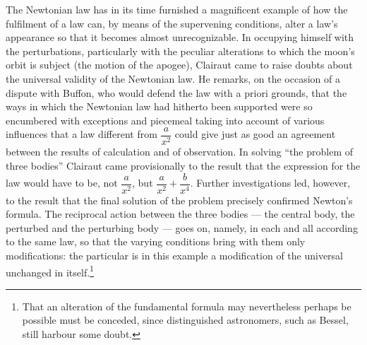 \documentclass[12pt,a4paper]{book}
\begin{document}
The Newtonian law has in its time furnished a magnificent example of how the fulfilment
of a law can, by means of the
supervening conditions, alter a law's appearance so that it becomes almost
unrecognizable. In occupying himself with the perturbations, particularly with the
peculiar alterations to which the moon's orbit is subject (the motion of the apogee),
Clairaut came to raise doubts about the universal validity of the Newtonian law. He
remarks, on the occasion of a dispute with Buffon, who would defend the law with a
priori grounds, that the ways in which the Newtonian law had hitherto been supported
were so encumbered with exceptions and piecemeal taking into account of various
influences that a law different from $\dfrac{a}{x^{2}}$ could give just as good an
agreement between the results of calculation and of observation. In solving ``the
problem of three bodies'' Clairaut came provisionally to the result that the expression
for the law would have to be, not $\dfrac{a}{x^{2}}$, but
$\dfrac{a}{x^{2}} + \dfrac{b}{x^{4}}$. Further investigations led, however, to the
result that the final solution of the problem precisely confirmed Newton's formula. The
reciprocal action between the three bodies --- the central body, the perturbed and the
perturbing body --- goes on, namely, in each and all according to the same law, so that
the varying conditions bring with them only modifications: the particular is in this
example a
modification of the universal unchanged in itself.\footnote{That an alteration of the
fundamental formula may nevertheless perhaps be possible must be conceded, since
distinguished astronomers, such as Bessel, still harbour some doubt.}
\end{document}
